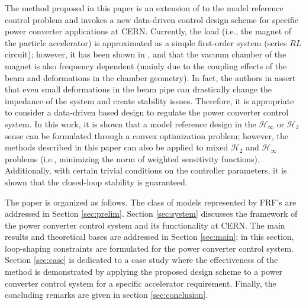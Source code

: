\documentclass[a4paper, 10pt, conference]{ieeeconf}
\begin{document}
The method proposed in this paper is an extension of \cite{KK16} to the model reference control problem and invokes a new data-driven control design scheme for specific power converter applications at CERN. Currently, the load (i.e., the magnet of the particle accelerator) is approximated as a simple first-order system (series $RL$ circuit); however, it has been shown in \cite{KZ98}, \cite{NW95} and \cite{NS79} that the vacuum chamber of the magnet is also frequency dependent (mainly due to the coupling effects of the beam and deformations in the chamber geometry). In fact, the authors in \cite{NW95} assert that even small deformations in the beam pipe can drastically change the impedance of the system and create stability issues. Therefore, it is appropriate to consider a data-driven based design to regulate the power converter control system.  In this work, it is shown that a model reference design in the $\mathcal{H}_\infty$ or $\mathcal{H}_2$ sense can be formulated through a convex optimization problem; however, the methods described in this paper can also be applied to mixed $\mathcal{H}_2$ and $\mathcal{H}_\infty$ problems (i.e., minimizing the norm of weighted sensitivity functions). Additionally, with certain trivial conditions on the controller parameters, it is shown that the closed-loop stability is guaranteed. 

The paper is organized as follows. The class of models represented by FRF's are addressed in Section \ref{sec:prelim}. Section \ref{sec:system} discusses the framework of the power converter control system and its functionality at CERN. The main results and theoretical bases are addressed in Section \ref{sec:main}; in this section, loop-shaping constraints are formulated for the power converter control system. Section \ref{sec:case} is dedicated to a case study where the effectiveness of the method is demonstrated by applying the proposed design scheme to a power converter control system for a specific accelerator requirement. Finally, the concluding remarks are given in section \ref{sec:conclusion}.
\end{document}
